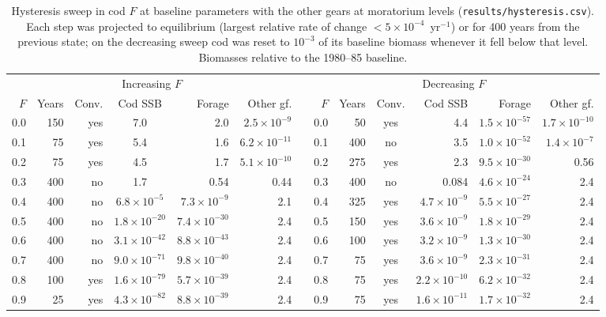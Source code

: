 \documentclass[11pt,letterpaper,fleqn]{article}
\newcommand{\yr}{yr$^{-1}$}
\begin{document}
\begin{table}[p]\caption{Hysteresis sweep in cod $F$ at baseline parameters with the other gears at moratorium levels (\nolinkurl{results/hysteresis.csv}). Each step was projected to equilibrium (largest relative rate of change $<5\times10^{-4}$~\yr{}) or for 400 years from the previous state; on the decreasing sweep cod was reset to $10^{-3}$ of its baseline biomass whenever it fell below that level. Biomasses relative to the 1980--85 baseline.}\label{tab:S-hyst}
\centering\scriptsize\begin{adjustbox}{max width=\textwidth}\begin{tabular}{@{}rrrcrrr|rrcrrr@{}}\toprule
\multicolumn{6}{c|}{Increasing $F$} & & \multicolumn{6}{c}{Decreasing $F$}\\
$F$ & Years & Conv. & Cod SSB & Forage & Other gf. & & $F$ & Years & Conv. & Cod SSB & Forage & Other gf.\\\midrule
0.0 & 150 & yes & 7.0 & 2.0 & $2.5\times10^{-9}$ & & 0.0 & 50 & yes & 4.4 & $1.5\times10^{-57}$ & $1.7\times10^{-10}$\\
0.1 & 75 & yes & 5.4 & 1.6 & $6.2\times10^{-11}$ & & 0.1 & 400 & no & 3.5 & $1.0\times10^{-52}$ & $1.4\times10^{-7}$\\
0.2 & 75 & yes & 4.5 & 1.7 & $5.1\times10^{-10}$ & & 0.2 & 275 & yes & 2.3 & $9.5\times10^{-30}$ & 0.56\\
0.3 & 400 & no & 1.7 & 0.54 & 0.44 & & 0.3 & 400 & no & 0.084 & $4.6\times10^{-24}$ & 2.4\\
0.4 & 400 & no & $6.8\times10^{-5}$ & $7.3\times10^{-9}$ & 2.1 & & 0.4 & 325 & yes & $4.7\times10^{-9}$ & $5.5\times10^{-27}$ & 2.4\\
0.5 & 400 & no & $1.8\times10^{-20}$ & $7.4\times10^{-30}$ & 2.4 & & 0.5 & 150 & yes & $3.6\times10^{-9}$ & $1.8\times10^{-29}$ & 2.4\\
0.6 & 400 & no & $3.1\times10^{-42}$ & $8.8\times10^{-43}$ & 2.4 & & 0.6 & 100 & yes & $3.2\times10^{-9}$ & $1.3\times10^{-30}$ & 2.4\\
0.7 & 400 & no & $9.0\times10^{-71}$ & $9.8\times10^{-40}$ & 2.4 & & 0.7 & 75 & yes & $3.6\times10^{-9}$ & $2.3\times10^{-31}$ & 2.4\\
0.8 & 100 & yes & $1.6\times10^{-79}$ & $5.7\times10^{-39}$ & 2.4 & & 0.8 & 75 & yes & $2.2\times10^{-10}$ & $6.2\times10^{-32}$ & 2.4\\
0.9 & 25 & yes & $4.3\times10^{-82}$ & $8.8\times10^{-39}$ & 2.4 & & 0.9 & 75 & yes & $1.6\times10^{-11}$ & $1.7\times10^{-32}$ & 2.4\\

\end{tabular}
\end{adjustbox}
\end{table}
\end{document}
